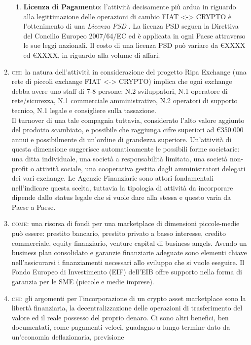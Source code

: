 \documentclass[11pt,fleqn,oneside]{book} %
\begin{document}
\begin{enumerate}
\begin{enumerate}[label*=\arabic*.]
			\item \textbf{Licenza di Pagamento}: l'attività decisamente più ardua in riguardo alla legittimazione delle operazioni di cambio FIAT <-> CRYPTO
			è l'ottenimento di una \textit{Licenza PSD} \cite{PSD}.
			La licenza PSD seguen la Direttiva del Concilio Europeo 2007/64/EC ed è applicata in ogni Paese attraverso le sue leggi nazionali.
			Il costo di una licenza PSD può variare da \euro XXXX ed \euro XXXX, in riguardo alla volume di affari.
		\end{enumerate}
	\item \textsc{chi}: la natura dell'attività in considerazione del progetto Ripa Exchange (una rete di piccoli exchange FIAT <-> CRYPTO)
	implica che ogni exchange debba avere uno staff di 7-8 persone: N.2 sviluppatori, N.1 operatore di rete/sicurezza, 
	N.1 commerciale amministrativo, N.2 operatori di supporto tecnico, N.1 legale e consigliere sulla tassazione. \\
	Il turnover di una tale compagnia tuttavia, considerato l'alto valore aggiunto del prodotto scambiato, e possibile che raggiunga cifre
	superiori ad \euro 350.000 annui e possibilmente di un'ordine di grandezza superiore. Un'attività di questa dimensione
	suggerisce automaticamente le possibili forme societarie: una ditta individuale, una società a responsabilità limitata,
	una società non-profit o attività sociale, una cooperativa gestita dagli amministratori delegati dei vari exchange.
	Le Agenzie Finanziarie sono attori fondamentali nell'indicare questa scelta, tuttavia la tipologia di attività da
	incorporare dipende dallo status legale che si vuole dare alla stessa e questo varia da Paese a Paese.		
	\item \textsc{come}: una risorsa di fondi per una marketplace di dimensioni piccole-medie può essere: prestito bancario,
	prestito privato a basso interesse, credito commerciale, equity finanziario, venture capital di business angels. Avendo un
	business plan consolidato e garanzie finanziarie adeguate sono elementi chiave nell'assicurarsi i finanziamenti necessari
	allo sviluppo che si vuole eseguire. Il Fondo Europeo di Investimento (EIF) dell'EIB offre supporto nella forma di 
	garanzia per le SME (piccole e medie imprese).
	\item \textsc{chi}: gli argomenti per l'incorporazione di un crypto asset marketplace sono la libertà finanziaria, la
	decentralizzazione delle operazioni di trasferimento del valore ed il reale possesso del proprio denaro.
	Ci sono altri benefici, ben documentati, come pagamenti veloci, guadagno a lungo termine dato da un'economia deflazionaria, previsione

\end{enumerate}
\end{document}

